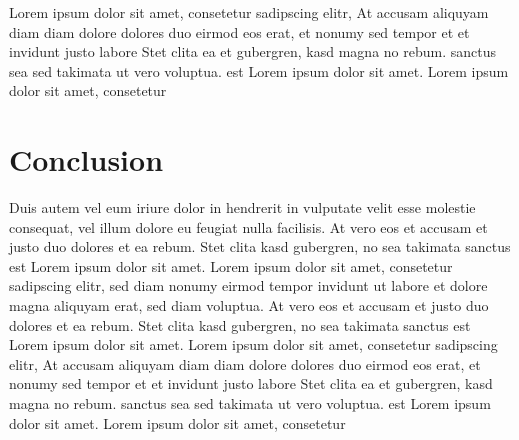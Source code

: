 \documentclass[11pt,twoside,a4paper,titlepage]{article}
\begin{document}
Lorem ipsum dolor sit amet, consetetur sadipscing elitr, At accusam aliquyam diam diam dolore dolores duo eirmod eos erat, et nonumy sed tempor et et invidunt justo labore Stet clita ea et gubergren, kasd magna no rebum. sanctus sea sed takimata ut vero voluptua. est Lorem ipsum dolor sit amet. Lorem ipsum dolor sit amet, consetetur\\




\section{Conclusion}

Duis autem vel eum iriure dolor in hendrerit in vulputate velit esse molestie consequat, vel illum dolore eu feugiat nulla facilisis. At vero eos et accusam et justo duo dolores et ea rebum. Stet clita kasd gubergren, no sea takimata sanctus est Lorem ipsum dolor sit amet. Lorem ipsum dolor sit amet, consetetur sadipscing elitr, sed diam nonumy eirmod tempor invidunt ut labore et dolore magna aliquyam erat, sed diam voluptua. At vero eos et accusam et justo duo dolores et ea rebum. Stet clita kasd gubergren, no sea takimata sanctus est Lorem ipsum dolor sit amet. Lorem ipsum dolor sit amet, consetetur sadipscing elitr, At accusam aliquyam diam diam dolore dolores duo eirmod eos erat, et nonumy sed tempor et et invidunt justo labore Stet clita ea et gubergren, kasd magna no rebum. sanctus sea sed takimata ut vero voluptua. est Lorem ipsum dolor sit amet. Lorem ipsum dolor sit amet, consetetur\\




\nocite{*} %


\end{document}
